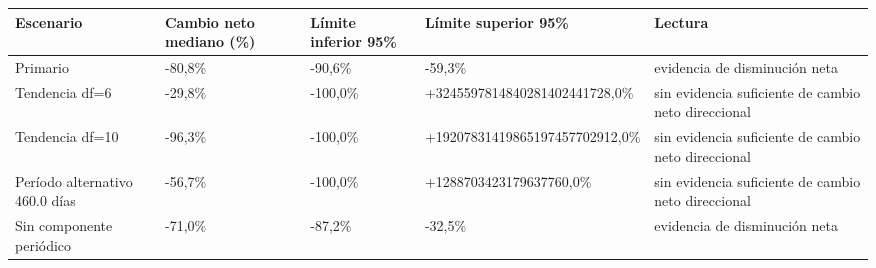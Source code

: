 \begin{tabular}{lllll}
\toprule
Escenario & Cambio neto mediano (\%) & Límite inferior 95\% & Límite superior 95\% & Lectura \\
\midrule
Primario & -80,8\% & -90,6\% & -59,3\% & evidencia de disminución neta \\
Tendencia df=6 & -29,8\% & -100,0\% & +3245597814840281402441728,0\% & sin evidencia suficiente de cambio neto direccional \\
Tendencia df=10 & -96,3\% & -100,0\% & +19207831419865197457702912,0\% & sin evidencia suficiente de cambio neto direccional \\
Período alternativo 460.0 días & -56,7\% & -100,0\% & +1288703423179637760,0\% & sin evidencia suficiente de cambio neto direccional \\
Sin componente periódico & -71,0\% & -87,2\% & -32,5\% & evidencia de disminución neta \\
\bottomrule
\end{tabular}
